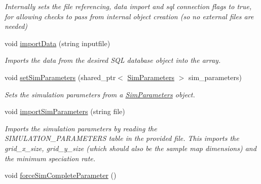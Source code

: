 \begin{DoxyCompactItemize}
\begin{DoxyCompactList}\small\item\em Internally sets the file referencing, data import and sql connection flags to true, for allowing checks to pass from internal object creation (so no external files are needed) \end{DoxyCompactList}\item 
void \hyperlink{class_community_a85db7255d3a1d53509ed2800fc24de31}{import\+Data} (string inputfile)
\begin{DoxyCompactList}\small\item\em Imports the data from the desired S\+QL database object into the array. \end{DoxyCompactList}\item 
void \hyperlink{class_community_a3a21f87a9dc145e409a2d15c993609e7}{set\+Sim\+Parameters} (shared\+\_\+ptr$<$ \hyperlink{struct_sim_parameters}{Sim\+Parameters} $>$ sim\+\_\+parameters)
\begin{DoxyCompactList}\small\item\em Sets the simulation parameters from a \hyperlink{struct_sim_parameters}{Sim\+Parameters} object. \end{DoxyCompactList}\item 
void \hyperlink{class_community_a548d36e99e592f0bfc09c8315b27f8bb}{import\+Sim\+Parameters} (string file)
\begin{DoxyCompactList}\small\item\em Imports the simulation parameters by reading the S\+I\+M\+U\+L\+A\+T\+I\+O\+N\+\_\+\+P\+A\+R\+A\+M\+E\+T\+E\+RS table in the provided file. This imports the grid\+\_\+x\+\_\+size, grid\+\_\+y\+\_\+size (which should also be the sample map dimensions) and the minimum speciation rate. \end{DoxyCompactList}\item 
void \hyperlink{class_community_a0cf6c13b8c630f9cf9d9e8a946a1229e}{force\+Sim\+Complete\+Parameter} ()\hypertarget{class_community_a0cf6c13b8c630f9cf9d9e8a946a1229e}{}\label{class_community_a0cf6c13b8c630f9cf9d9e8a946a1229e}


\end{DoxyCompactItemize}
